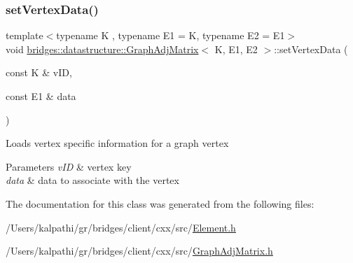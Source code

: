 \subsubsection{\texorpdfstring{set\+Vertex\+Data()}{setVertexData()}}
{\footnotesize\ttfamily template$<$typename K , typename E1  = K, typename E2  = E1$>$ \\
void \mbox{\hyperlink{classbridges_1_1datastructure_1_1_graph_adj_matrix}{bridges\+::datastructure\+::\+Graph\+Adj\+Matrix}}$<$ K, E1, E2 $>$\+::set\+Vertex\+Data (\begin{DoxyParamCaption}\item[{const K \&}]{v\+ID,  }\item[{const E1 \&}]{data }\end{DoxyParamCaption})\hspace{0.3cm}{\ttfamily [inline]}}

Loads vertex specific information for a graph vertex


\begin{DoxyParams}{Parameters}
{\em v\+ID} & vertex key \\
\hline
{\em data} & data to associate with the vertex \\
\hline
\end{DoxyParams}


The documentation for this class was generated from the following files\+:\begin{DoxyCompactItemize}
\item 
/\+Users/kalpathi/gr/bridges/client/cxx/src/\mbox{\hyperlink{_element_8h}{Element.\+h}}\item 
/\+Users/kalpathi/gr/bridges/client/cxx/src/\mbox{\hyperlink{_graph_adj_matrix_8h}{Graph\+Adj\+Matrix.\+h}}\end{DoxyCompactItemize}
